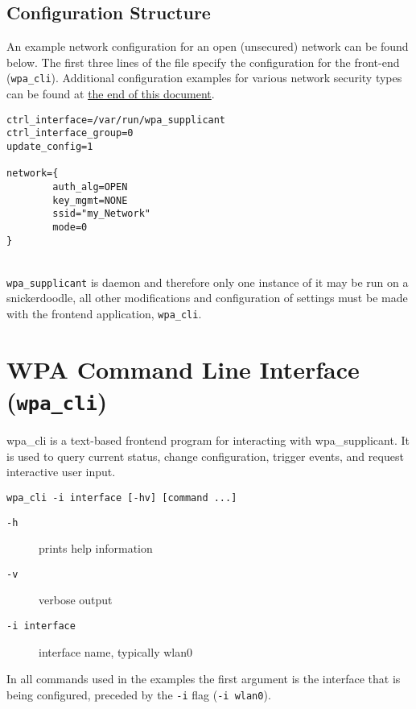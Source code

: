 \subsection{Configuration Structure}


\noindent
An example network configuration for an open (unsecured) network can be found below. The first three lines of the file specify the configuration for the front-end (\texttt{wpa\_cli}). Additional configuration examples for various network security types can be found at \hyperref[sec:wpaconftypes]{the end of this document}. \\

\begin{lstlisting}[style=text]
ctrl_interface=/var/run/wpa_supplicant
ctrl_interface_group=0					
update_config=1

network={
        auth_alg=OPEN
        key_mgmt=NONE
        ssid="my_Network"
        mode=0
}
\end{lstlisting}


~\\
\noindent
\texttt{wpa\_supplicant} is daemon and therefore only one instance of it may be run on a snickerdoodle, all other modifications and configuration of settings must be made with the frontend application, \texttt{wpa\_cli}.

\section{WPA Command Line Interface (\texttt{wpa\_cli})}

wpa\_cli is a text-based frontend program for interacting with wpa\_supplicant. It is used to query current status,
change configuration, trigger events, and request interactive user input. \\

\begin{lstlisting}[style=text]
wpa_cli -i interface [-hv] [command ...]
\end{lstlisting}

\begin{description}
	\item[\texttt{-h}] prints help information
	\item[\texttt{-v}] verbose output
	\item[\texttt{-i interface}] interface name, typically wlan0
\end{description}


\noindent
In all commands used in the examples the first argument is the interface that is being configured, preceded by the \texttt{-i} flag (\texttt{-i wlan0}).



